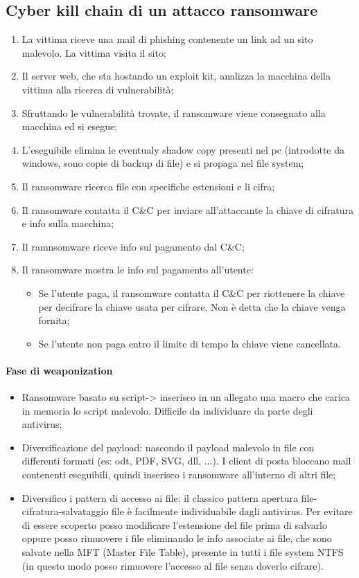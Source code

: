 \subsection{Cyber kill chain di un attacco ransomware}
\begin{enumerate}
    \item La vittima riceve una mail di phishing contenente un link ad un sito malevolo. La vittima visita il sito;
    \item Il server web, che sta hostando un exploit kit, analizza la macchina della vittima alla ricerca di vulnerabilità;
    \item Sfruttando le vulnerabilità trovate, il ransomware viene consegnato alla macchina ed si esegue;
    \item L'eseguibile elimina le eventualy shadow copy presenti nel pc (introdotte da windows, sono copie di backup di file) e si propaga nel file system;
    \item Il ransomware ricerca file con specifiche estensioni e li cifra;
    \item Il ransomware contatta il C\&C per inviare all'attaccante la chiave di cifratura e info sulla macchina;
    \item Il ramnsomware riceve info sul pagamento dal C\&C;
    \item Il ransomware mostra le info sul pagamento all'utente:
    	\begin{itemize}
    	    \item Se l'utente paga, il ransomware contatta il C\&C per riottenere la chiave per decifrare la chiave usata per cifrare. Non è detta che la chiave venga fornita;
           \item Se l'utente non paga entro il limite di tempo la chiave viene cancellata.
    	\end{itemize}
\end{enumerate}

\paragraph{Fase di weaponization}
\begin{itemize}
    \item Ransomware basato su script-> inserisco in un allegato una macro che carica in memoria lo script malevolo. Difficile da individuare da parte degli antivirus;
    \item Diversificazione del payload: nascondo il payload malevolo in file con differenti formati (es: odt, PDF, SVG, dll, ...). I client di posta bloccano mail contenenti eseguibili, quindi inserisco i ransomware all'interno di altri file;
    \item Diversifico i pattern di accesso ai file: il classico pattern apertura file-cifratura-salvataggio file è facilmente individuabile dagli antivirus. Per evitare di essere scoperto posso modificare l'estensione del file prima di salvarlo oppure posso rimuovere i file eliminando le info associate ai file, che sono salvate nella MFT (Master File Table), presente in tutti i file system NTFS (in questo modo posso rimuovere l'accesso al file senza doverlo cifrare).
\end{itemize}

